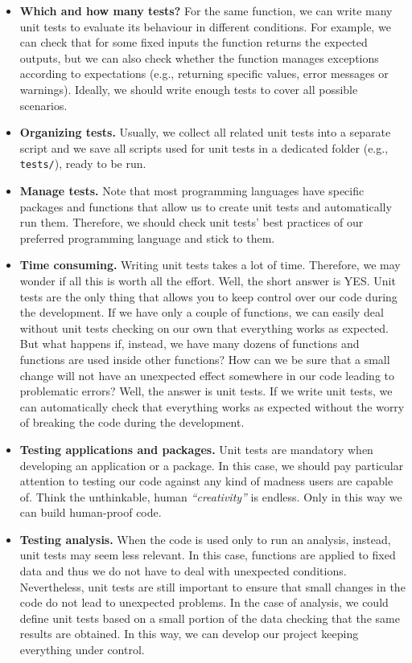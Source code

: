 \documentclass[
  11pt,
]{book}
\providecommand{\tightlist}{%
  \setlength{\itemsep}{0pt}\setlength{\parskip}{0pt}}
\begin{document}
\begin{itemize}
\tightlist
\item
  \textbf{Which and how many tests?} For the same function, we can write many unit tests to evaluate its behaviour in different conditions. For example, we can check that for some fixed inputs the function returns the expected outputs, but we can also check whether the function manages exceptions according to expectations (e.g., returning specific values, error messages or warnings). Ideally, we should write enough tests to cover all possible scenarios.
\item
  \textbf{Organizing tests.} Usually, we collect all related unit tests into a separate script and we save all scripts used for unit tests in a dedicated folder (e.g., \texttt{tests/}), ready to be run.
\item
  \textbf{Manage tests.} Note that most programming languages have specific packages and functions that allow us to create unit tests and automatically run them. Therefore, we should check unit tests' best practices of our preferred programming language and stick to them.
\item
  \textbf{Time consuming.} Writing unit tests takes a lot of time. Therefore, we may wonder if all this is worth all the effort. Well, the short answer is YES. Unit tests are the only thing that allows you to keep control over our code during the development. If we have only a couple of functions, we can easily deal without unit tests checking on our own that everything works as expected. But what happens if, instead, we have many dozens of functions and functions are used inside other functions? How can we be sure that a small change will not have an unexpected effect somewhere in our code leading to problematic errors? Well, the answer is unit tests. If we write unit tests, we can automatically check that everything works as expected without the worry of breaking the code during the development.
\item
  \textbf{Testing applications and packages.} Unit tests are mandatory when developing an application or a package. In this case, we should pay particular attention to testing our code against any kind of madness users are capable of. Think the unthinkable, human \emph{``creativity''} is endless. Only in this way we can build human-proof code.
\item
  \textbf{Testing analysis.} When the code is used only to run an analysis, instead, unit tests may seem less relevant. In this case, functions are applied to fixed data and thus we do not have to deal with unexpected conditions. Nevertheless, unit tests are still important to ensure that small changes in the code do not lead to unexpected problems. In the case of analysis, we could define unit tests based on a small portion of the data checking that the same results are obtained. In this way, we can develop our project keeping everything under control.

\end{itemize}
\end{document}
